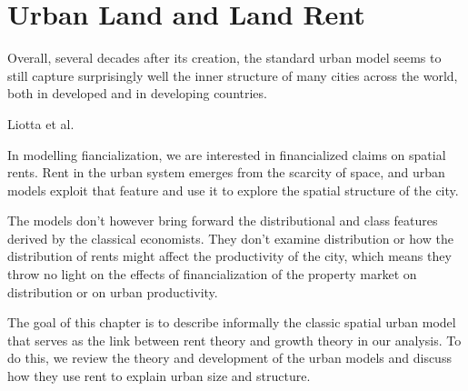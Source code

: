 \chapter{Urban Land and Land Rent} \label{chapter-space}

\epigraph{Overall, several decades after its creation, the standard urban model seems to still capture surprisingly well the inner structure of many cities across the world, both in developed and in developing countries.}{Liotta et al. 
 \cite{liottaTestingMonocentricStandard2022}}



In modelling fiancialization, we are interested in financialized claims on spatial rents. 
Rent in the urban system emerges from the %
scarcity of space, and %
urban models exploit that feature and use it to explore the spatial structure of the city.

The models don't however bring forward the distributional and class features derived by the classical economists.  They don't examine distribution or how the distribution of rents might affect the productivity of the city, which means they throw no light on the effects of financialization of the property market on distribution or on urban productivity.

The goal of this chapter is to describe informally the classic spatial urban model that serves as the link between rent theory and growth theory in our analysis. %
To do this, we review the theory and development of the urban models and discuss how they %
use rent to explain urban size and structure. 



